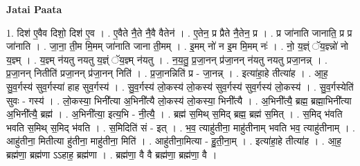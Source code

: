 \documentclass[17pt]{extarticle}
\begin{document}
\textbf{Jatai Paata} \newline

1. दिश॑ ए॒वैव दिशो॒ दिश॑ ए॒व । . ए॒वैते नै॒ते नै॒वै वैतेन॑ । . ए॒तेन॒ प्र प्रैते नै॒तेन॒ प्र । . प्र जा॑नाति जानाति॒ प्र प्र जा॑नाति । . जा॒ना॒ ती॒म मि॒मम् जा॑नाति जाना ती॒मम् । . इ॒मम् नो॑ न इ॒म मि॒मम् नः॑ । . नो॒ य॒ज्ञ्ं ॅय॒ज्ञ्न्नो॑ नो य॒ज्ञ्म् । . य॒ज्ञ्म् न॑यतु नयतु य॒ज्ञ्ं ॅय॒ज्ञ्म् न॑यतु । . न॒य॒तु॒ प्र॒जा॒नन् प्र॑जा॒नन् न॑यतु नयतु प्रजा॒नन्न् । . प्र॒जा॒नन् नितीति॑ प्रजा॒नन् प्र॑जा॒नन् निति॑ । . प्र॒जा॒नन्निति॑ प्र - जा॒नन्न् । . इत्या॑हा॒हे तीत्या॑ह । . आ॒ह॒ सु॒व॒र्गस्य॑ सुव॒र्गस्या॑ हाह सुव॒र्गस्य॑ । . सु॒व॒र्गस्य॑ लो॒कस्य॑ लो॒कस्य॑ सुव॒र्गस्य॑ सुव॒र्गस्य॑ लो॒कस्य॑ । . सु॒व॒र्गस्येति॑ सुवः - गस्य॑ । . लो॒कस्या॒ भिनी᳚त्या अ॒भिनी᳚त्यै लो॒कस्य॑ लो॒कस्या॒ भिनी᳚त्यै । . अ॒भिनी᳚त्यै॒ ब्रह्म॒ ब्रह्मा॒भिनी᳚त्या अ॒भिनी᳚त्यै॒ ब्रह्म॑ । . अ॒भिनी᳚त्या॒ इत्य॒भि - नी॒त्यै॒ । . ब्रह्म॑ स॒मिथ् स॒मिद् ब्रह्म॒ ब्रह्म॑ स॒मित् । . स॒मिद् भ॑वति भवति स॒मिथ् स॒मिद् भ॑वति । . स॒मिदिति॑ सं - इत् । . भ॒व॒ त्याहु॑तीना॒ माहु॑तीनाम् भवति भव॒ त्याहु॑तीनाम् । . आहु॑तीना॒ मितीत्या हु॑तीना॒ माहु॑तीना॒ मिति॑ । . आहु॑तीना॒मित्या - हु॒ती॒ना॒म् । . इत्या॑हा॒हे तीत्या॑ह । . आ॒ह॒ ब्रह्म॑णा॒ ब्रह्म॑णा ऽऽहाह॒ ब्रह्म॑णा । . ब्रह्म॑णा॒ वै वै ब्रह्म॑णा॒ ब्रह्म॑णा॒ वै । \newline
\end{document}
